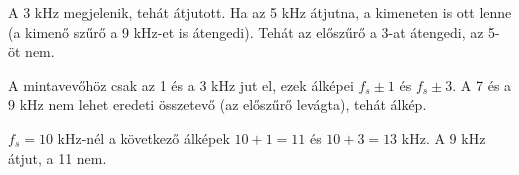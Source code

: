 A 3 kHz megjelenik, tehát átjutott. Ha az 5 kHz átjutna, a kimeneten is ott lenne (a kimenő szűrő a 9 kHz-et is átengedi). Tehát az előszűrő a 3-at átengedi, az 5-öt nem.

\begin{center}\end{center}

A mintavevőhöz csak az 1 és a 3 kHz jut el, ezek álképei $f_s\pm1$ és $f_s\pm3$. A 7 és a 9 kHz nem lehet eredeti összetevő (az előszűrő levágta), tehát álkép.

\begin{center}\end{center}

\begin{center}\end{center}

$f_s=10$ kHz-nél a következő álképek $10+1=11$ és $10+3=13$ kHz. A 9 kHz átjut, a 11 nem.

\begin{center}\end{center}


